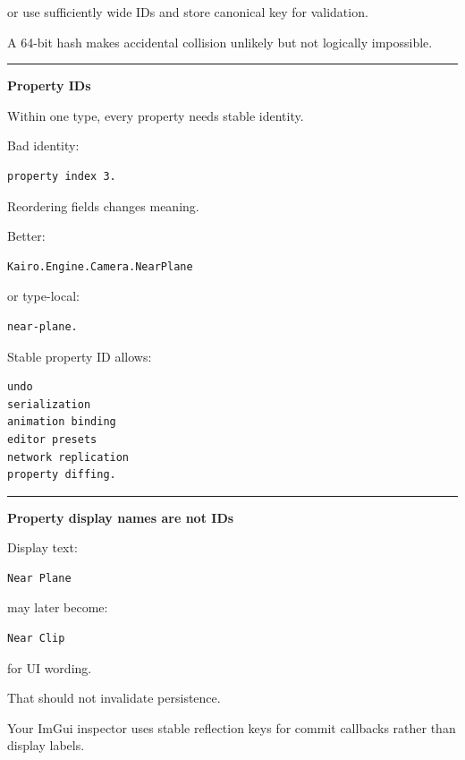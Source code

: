 or use sufficiently wide IDs and store canonical key for validation.

A 64-bit hash makes accidental collision unlikely but not logically impossible.

\begin{center}\rule{0.5\linewidth}{0.5pt}\end{center}

\textbf{Property IDs}

Within one type, every property needs stable identity.

Bad identity:

\begin{verbatim}
property index 3.
\end{verbatim}

Reordering fields changes meaning.

Better:

\begin{verbatim}
Kairo.Engine.Camera.NearPlane
\end{verbatim}

or type-local:

\begin{verbatim}
near-plane.
\end{verbatim}

Stable property ID allows:

\begin{verbatim}
undo
serialization
animation binding
editor presets
network replication
property diffing.
\end{verbatim}

\begin{center}\rule{0.5\linewidth}{0.5pt}\end{center}

\textbf{Property display names are not IDs}

Display text:

\begin{verbatim}
Near Plane
\end{verbatim}

may later become:

\begin{verbatim}
Near Clip
\end{verbatim}

for UI wording.

That should not invalidate persistence.

Your ImGui inspector uses stable reflection keys for commit callbacks rather than display labels.


